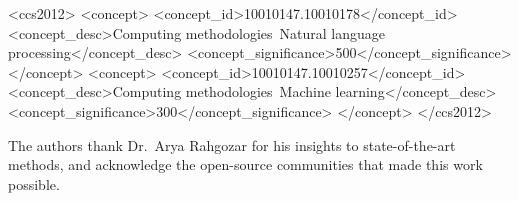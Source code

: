 \documentclass[sigplan,screen]{acmart}
\begin{document}
\begin{CCSXML}
<ccs2012>
 <concept>
  <concept_id>10010147.10010178</concept_id>
  <concept_desc>Computing methodologies~Natural language processing</concept_desc>
  <concept_significance>500</concept_significance>
 </concept>
 <concept>
  <concept_id>10010147.10010257</concept_id>
  <concept_desc>Computing methodologies~Machine learning</concept_desc>
  <concept_significance>300</concept_significance>
 </concept>
</ccs2012>
\end{CCSXML}




\maketitle













\begin{acks}
The authors thank Dr.\ Arya Rahgozar for his insights to state-of-the-art methods, and acknowledge the open-source communities that made this work possible.
\end{acks}
\end{document}
